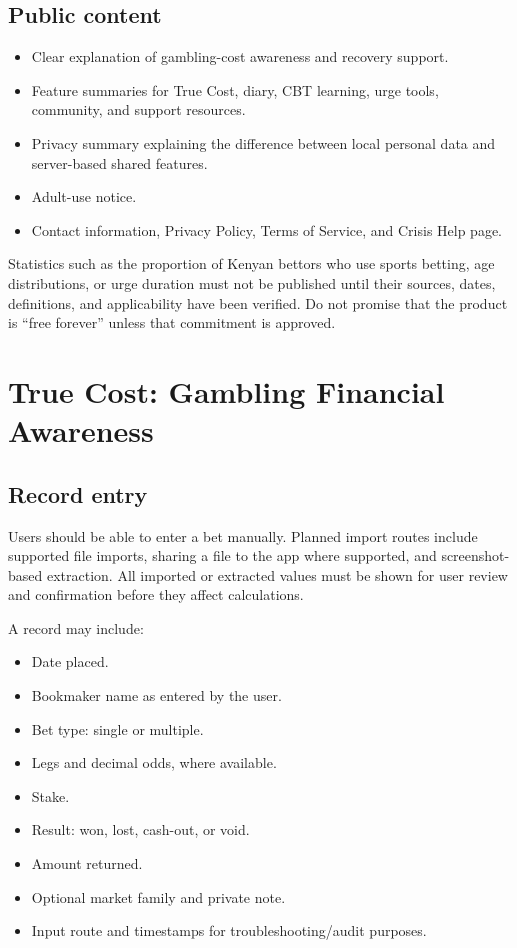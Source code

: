 \documentclass[11pt,a4paper]{article}
\begin{document}
\subsection{Public content}
\begin{itemize}
  \item Clear explanation of gambling-cost awareness and recovery support.
  \item Feature summaries for True Cost, diary, CBT learning, urge tools, community, and support resources.
  \item Privacy summary explaining the difference between local personal data and server-based shared features.
  \item Adult-use notice.
  \item Contact information, Privacy Policy, Terms of Service, and Crisis Help page.
\end{itemize}

Statistics such as the proportion of Kenyan bettors who use sports betting, age distributions, or urge duration must not be published until their sources, dates, definitions, and applicability have been verified. Do not promise that the product is ``free forever'' unless that commitment is approved.

\section{True Cost: Gambling Financial Awareness}

\subsection{Record entry}
Users should be able to enter a bet manually. Planned import routes include supported file imports, sharing a file to the app where supported, and screenshot-based extraction. All imported or extracted values must be shown for user review and confirmation before they affect calculations.

A record may include:
\begin{itemize}
  \item Date placed.
  \item Bookmaker name as entered by the user.
  \item Bet type: single or multiple.
  \item Legs and decimal odds, where available.
  \item Stake.
  \item Result: won, lost, cash-out, or void.
  \item Amount returned.
  \item Optional market family and private note.
  \item Input route and timestamps for troubleshooting/audit purposes.
\end{itemize}
\end{document}
